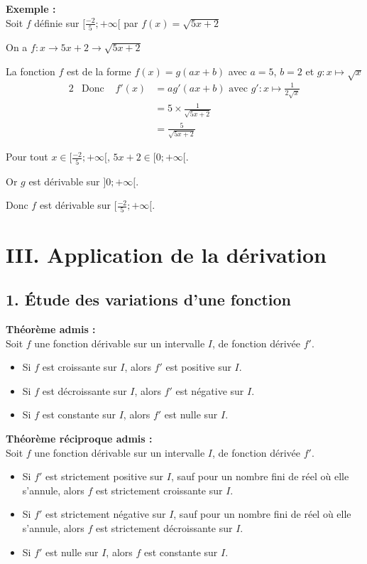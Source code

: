 \documentclass[11pt,a4paper]{article}
\begin{document}
\textbf{Exemple :} ~\\
Soit $f$ définie sur $[\frac{-2}{5};+\infty[$ par $f(x)=\sqrt{5x+2}$

On a $f:x \longrightarrow 5x+2 \longrightarrow  \sqrt{5x+2}$

La fonction $f$ est de la forme $f(x)=g(ax+b)$ avec $a=5$, $b=2$ et $g:x\mapsto\sqrt{x}$
\begin{alignat*}{2}
     & \text{Donc } & f'(x) & =ag'(ax+b) \text{ avec } g':x\mapsto\frac{1}{2\sqrt{x}} \\
     &              &       & =5\times \frac{1}{\sqrt{5x+2}}                          \\
     &              &       & =\frac{5}{\sqrt{5x+2}}
\end{alignat*}

Pour tout $x\in[\frac{-2}{5};+\infty[$, $5x+2\in[0;+\infty[$.

            Or $g$ est dérivable sur $]0;+\infty[$.

Donc $f$ est dérivable sur $[\frac{-2}{5};+\infty[$.

\section*{III. Application de la dérivation}

\subsection*{1. Étude des variations d'une fonction}

\begin{mdframed}[style=proprieteStyle]
    \textbf{Théorème admis :} ~\\
    Soit $f$ une fonction dérivable sur un intervalle $I$, de fonction dérivée $f'$.
    \begin{itemize}
        \item Si $f$ est croissante sur $I$, alors $f'$ est positive sur $I$.
        \item Si $f$ est décroissante sur $I$, alors $f'$ est négative sur $I$.
        \item Si $f$ est constante sur $I$, alors $f'$ est nulle sur $I$.
    \end{itemize}
\end{mdframed}

\begin{mdframed}[style=proprieteStyle]
    \textbf{Théorème réciproque admis :} ~\\
    Soit $f$ une fonction dérivable sur un intervalle $I$, de fonction dérivée $f'$.
    \begin{itemize}
        \item Si $f'$ est strictement positive sur $I$, sauf pour un nombre fini de réel où elle s'annule, alors $f$ est strictement croissante sur $I$.
        \item Si $f'$ est strictement négative sur $I$, sauf pour un nombre fini de réel où elle s'annule, alors $f$ est strictement décroissante sur $I$.
        \item Si $f'$ est nulle sur $I$, alors $f$ est constante sur $I$.
    \end{itemize}
\end{mdframed}
\end{document}
